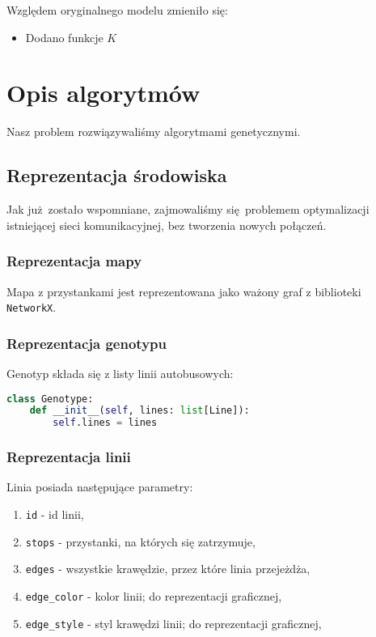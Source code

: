 \documentclass[12pt,a4paper]{article}
\begin{document}
Względem oryginalnego modelu zmieniło się:
\begin{itemize}
	\item Dodano funkcje $K$
\end{itemize}







\section{Opis algorytmów}
Nasz problem rozwiązywaliśmy algorytmami genetycznymi.

\subsection{Reprezentacja środowiska}
Jak już zostało wspomniane, zajmowaliśmy się problemem optymalizacji istniejącej sieci komunikacyjnej, bez tworzenia nowych połączeń.

\subsubsection{Reprezentacja mapy}
Mapa z przystankami jest reprezentowana jako ważony graf z biblioteki \lstinline{NetworkX}.

\subsubsection{Reprezentacja genotypu}
Genotyp składa się z listy linii autobusowych:
\begin{lstlisting}[language=Python]
class Genotype:
    def __init__(self, lines: list[Line]):
        self.lines = lines
\end{lstlisting}

\subsubsection{Reprezentacja linii}
Linia posiada następujące parametry:
\begin{enumerate}
    \item \lstinline{id} - id linii,
    \item \lstinline{stops} - przystanki, na których się zatrzymuje,
    \item \lstinline{edges} - wszystkie krawędzie, przez które linia przejeżdża,
    \item \lstinline{edge_color} - kolor linii; do reprezentacji graficznej,
    \item \lstinline{edge_style} - styl krawędzi linii; do reprezentacji graficznej,
\end{enumerate}
\end{document}
